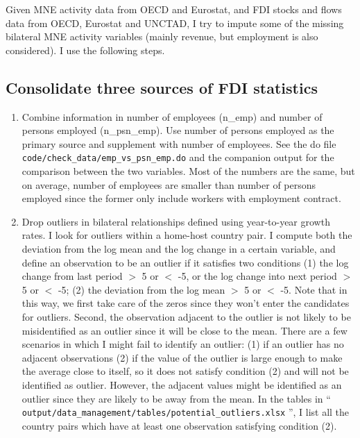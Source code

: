 \documentclass[notitlepage,11pt]{article}%
\begin{document}
Given MNE activity data from OECD and Eurostat, and FDI stocks and flows data
from OECD, Eurostat and UNCTAD, I try to impute some of the missing bilateral
MNE activity variables (mainly revenue, but employment is also considered). I
use the following steps.

\subsection{Consolidate three sources of FDI statistics}

\begin{enumerate}
\item Combine information in number of employees (n\_emp) and number of
persons employed (n\_psn\_emp). Use number of persons employed as the primary
source and supplement with number of employees. See the do file
\texttt{code/check\_data/emp\_vs\_psn\_emp.do} and the companion output for
the comparison between the two variables. Most of the numbers are the same,
but on average, number of employees are smaller than number of persons
employed since the former only include workers with employment contract.

\item Drop outliers in bilateral relationships defined using year-to-year
growth rates. I look for outliers within a home-host country pair. I compute
both the deviation from the log mean and the log change in a certain variable,
and define an observation to be an outlier if it satisfies two conditions (1)
the log change from last period
$>$
5 or
$<$
-5, or the log change into next period
$>$%
5 or
$<$
-5; (2) the deviation from the log mean
$>$
5 or
$<$
-5. Note that in this way, we first take care of the zeros since they won't
enter the candidates for outliers. Second, the observation adjacent to the
outlier is not likely to be misidentified as an outlier since it will be close
to the mean. There are a few scenarios in which I might fail to identify an
outlier: (1) if an outlier has no adjacent observations (2) if the value of
the outlier is large enough to make the average close to itself, so it does
not satisfy condition (2) and will not be identified as outlier. However, the
adjacent values might be identified as an outlier since they are likely to be
away from the mean. In the tables in \textquotedblleft%
\texttt{output/data\_management/tables/potential\_outliers.xlsx}%
\textquotedblright, I list all the country pairs which have at least one
observation satisfying condition (2).


\end{enumerate}
\end{document}
